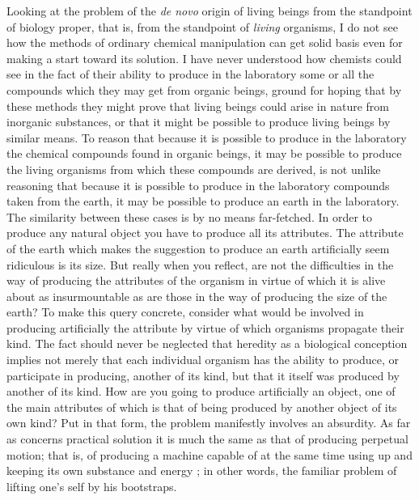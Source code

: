 \documentclass[a4paper, 11pt, oneside, polutonikogreek, english]{article}
\begin{document}
Looking at the problem of the \emph{de novo} origin of living beings from the standpoint of biology proper, that is, from the standpoint of \emph{living} organisms, I do not see how the methods of ordinary chemical manipulation can get solid basis even for making a start toward its solution. I have never understood how chemists could see in the fact of their ability to produce in the laboratory some or all the compounds which they may get from organic beings, ground for hoping that by these methods they might prove that living beings could arise in nature from inorganic substances, or that it might be possible to produce living beings by similar means. To reason that because it is possible to produce in the laboratory the chemical compounds found in organic beings, it may be possible to produce the living organisms from which these compounds are derived, is not unlike reasoning that because it is possible to produce in the laboratory compounds taken from the earth, it may be possible to produce an earth in the laboratory. The similarity between these cases is by no means far-fetched. In order to produce any natural object you have to produce all its attributes. The attribute of the earth which makes the suggestion to produce an earth artificially seem ridiculous is its size. But really when you reflect, are not the difficulties in the way of producing the attributes of the organism in virtue of which it is alive about as insurmountable as are those in the way of producing the size of the earth? To make this query concrete, consider what would be involved in producing artificially the attribute by virtue of which organisms propagate their kind. The fact should never be neglected that heredity as a biological conception implies not merely that each individual organism has the ability to produce, or participate in producing, another of its kind, but that it itself was produced by another of its kind. How are you going to produce artificially an object, one of the main attributes of which is that of being produced by another object of its own kind? Put in that form, the problem manifestly involves an absurdity. As far as concerns practical solution it is much the same as that of producing perpetual motion; that is, of producing a machine capable of at the same time using up and keeping its own substance and energy ; in other words, the familiar problem of lifting one's self by his bootstraps.
\end{document}
